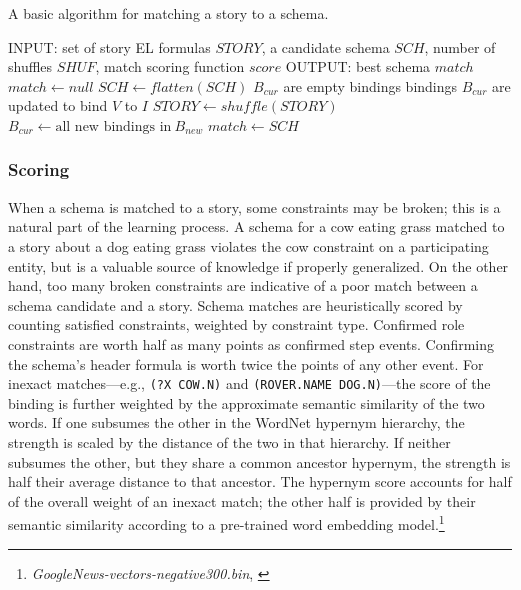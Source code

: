 \begin{algorithm}
\caption{A basic algorithm for matching a story to a schema.}
\label{alg:matching}
\begin{algorithmic}
\STATE INPUT: set of story EL formulas $STORY$, a candidate schema $SCH$, number of shuffles $SHUF$, match scoring function $score$
\STATE OUTPUT: best schema $match$
\STATE $match \gets null$
\STATE $SCH \gets flatten(SCH)$
\STATE $B_{cur}$ are empty bindings
            \STATE bindings $B_{cur}$ are updated to bind $V$ to $I$
        \ENDIF
    \ENDFOR
\ENDFOR
{}
    \STATE $STORY \gets shuffle(STORY)$
                \STATE $B_{cur} \gets \text{all new bindings in} \  B_{new}$
            \ENDIF
        \ENDFOR
    \ENDFOR
        \STATE $match \gets SCH$
    \ENDIF
\ENDFOR
\end{algorithmic}
\end{algorithm}

\subsubsection{Scoring}
\label{sec:scoring}
When a schema is matched to a story, some constraints may be broken; this is a natural part of the learning process. A schema for a cow eating grass matched to a story about a dog eating grass violates the cow constraint on a participating entity, but is a valuable source of knowledge if properly generalized. On the other hand, too many broken constraints are indicative of a poor match between a schema candidate and a story.
Schema matches are heuristically scored by counting satisfied constraints, weighted by constraint type.
Confirmed role constraints are worth half as many points as confirmed step events.
Confirming the schema's header formula is worth twice the points of any other event.
For inexact matches---e.g., \texttt{(?X COW.N)} and \texttt{(ROVER.NAME DOG.N)}---the score of the binding is further weighted by the approximate semantic similarity of the two words. If one subsumes the other in the WordNet hypernym hierarchy, the strength is scaled by the distance of the two in that hierarchy. If neither subsumes the other, but they share a common ancestor hypernym, the strength is half their average distance to that ancestor.
The hypernym score accounts for half of the overall weight of an inexact match; the other half is provided by their semantic similarity according to a pre-trained word embedding model.\footnote{\textit{GoogleNews-vectors-negative300.bin}, \citet{NIPS2013_5021}}

